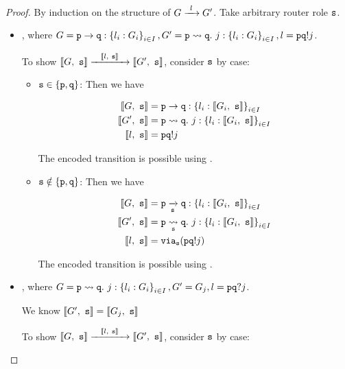 \begin{proof}
By induction on the structure of $\treduce{G}{G'}{l}$.
Take arbitrary router role $\mrole{s}$.

\begin{itemize}

\item {},
where $G = \gcomm{p}{q}{l_i: G_i}{i \in I},
G' = \gtrans{p}{q}{j}{l_i: G_i}{i \in I},
l = \aout{p}{q}{j}$.

To show $\treducelong
{\enc{G}{s}}{\enc{G'}{s}}{\enc{l}{s}}$,
consider $\mrole{s}$ by case:

\begin{itemize}

\item $\mrole{s} \in \{ \mrole{p}, \mrole{q} \}$:
Then we have

\begin{align*}
\enc{G}{s} &= \gcomm{p}{q}{l_i: \enc{G_i}{s}}{i \in I} \\
\enc{G'}{s} &= \gtrans{p}{q}{j}{l_i: \enc{G_i}{s}}{i \in I} \\
\enc{l}{s} &= \aout{p}{q}{j} \\
\end{align*}

The encoded transition is possible using .

\item $\mrole{s} \notin \{ \mrole{p}, \mrole{q} \}$:
Then we have

\begin{align*}
\enc{G}{s} &= \groute{p}{q}{s}{l_i: \enc{G_i}{s}}{i \in I} \\
\enc{G'}{s} &= \gtransroute{p}{q}{s}{j}{l_i: \enc{G_i}{s}}{i \in I} \\
\enc{l}{s} &= \via{s}{\aout{p}{q}{j}} \\
\end{align*}

The encoded transition is possible using .

\end{itemize}

\item {},
where $G = \gtrans{p}{q}{j}{l_i: G_i}{i \in I},
G' = G_j,
l = \ain{p}{q}{j}$.

We know $\enc{G'}{s} = \enc{G_j}{s}$

To show $\treducelong
{\enc{G}{s}}{\enc{G'}{s}}{\enc{l}{s}}$,
consider $\mrole{s}$ by case:

\begin{itemize}


\end{itemize}
\end{itemize}
\end{proof}
